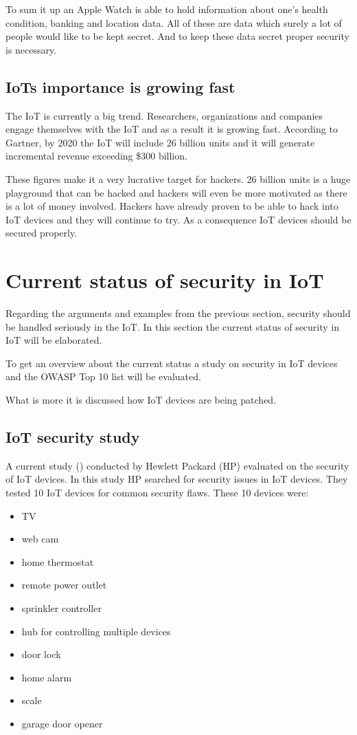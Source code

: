 \documentclass[conference]{IEEEtran}
\begin{document}
To sum it up an Apple Watch is able to hold information about one's health 
condition, banking and location data. All of these are data which 
surely a lot of people would like to be kept secret. And to keep these data 
secret proper security is necessary.

\subsection{IoTs importance is growing fast}
The IoT is currently a big trend. Researchers, organizations and companies 
engage themselves with the IoT and as a result it is growing fast. According to 
Gartner, by 2020 the IoT will include 26 billion units and it will generate 
incremental revenue exceeding \$300 billion. \cite{gartnerPage}

These figures make it a very lucrative target for hackers. 26 billion units is 
a huge playground that can be hacked and hackers will even be more motivated as 
there is a lot of money involved. Hackers have already proven to be able to 
hack into IoT devices and they will continue to try. As a consequence IoT 
devices should be secured properly.

\section{Current status of security in IoT}
Regarding the arguments and examples from the previous section, security should 
be handled seriously in the IoT. In this section the current status of security 
in IoT will be elaborated. 

To get an overview about the current status a study on security in IoT devices 
and the OWASP Top 10 list will be evaluated. 

What is more it is discussed how IoT devices are being patched.

\subsection{IoT security study}
A current study (\cite{HPstudy}) conducted by Hewlett Packard (HP) evaluated on 
the security of IoT devices. In this study HP searched for security issues in 
IoT devices. They tested 10 IoT devices for common security flaws. These 10 
devices were:

\begin{itemize}
\item TV
\item web cam
\item home thermostat
\item remote power outlet
\item sprinkler controller
\item hub for controlling multiple devices
\item door lock
\item home alarm
\item scale
\item garage door opener
\end{itemize}
\end{document}
